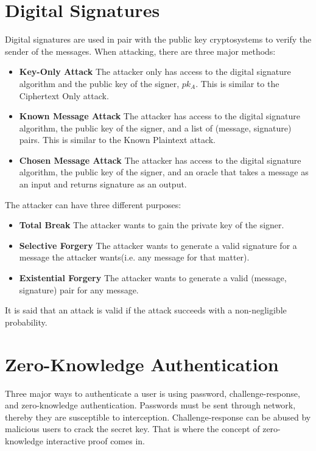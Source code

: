 \documentclass{report}
\begin{document}
	\section{Digital Signatures}
		Digital signatures are used in pair with the public key cryptosystems to verify the sender of the messages. When attacking, there are three major methods:
		\begin{itemize}
			\item \textbf{Key-Only Attack}
			\subitem The attacker only has access to the digital signature algorithm and the public key of the signer, $pk_A$. This is similar to the Ciphertext Only attack.
			\item \textbf{Known Message Attack}
			\subitem The attacker has access to the digital signature algorithm, the public key of the signer, and a list of (message, signature) pairs. This is similar to the Known Plaintext attack.
			\item \textbf{Chosen Message Attack}
			\subitem The attacker has access to the digital signature algorithm, the public key of the signer, and an oracle that takes a message as an input and returns signature as an output.
		\end{itemize}
		The attacker can have three different purposes:
		\begin{itemize}
			\item \textbf{Total Break}
			\subitem The attacker wants to gain the private key of the signer.
			\item \textbf{Selective Forgery}
			\subitem The attacker wants to generate a valid signature for a message the attacker wants(i.e. any message for that matter).
			\item \textbf{Existential Forgery}
			\subitem The attacker wants to generate a valid (message, signature) pair for any message.
		\end{itemize}
		It is said that an attack is valid if the attack succeeds with a non-negligible probability.
		
	\section{Zero-Knowledge Authentication}
		Three major ways to authenticate a user is using password, challenge-response, and zero-knowledge authentication. Passwords must be sent through network, thereby they are susceptible to interception. Challenge-response can be abused by malicious users to crack the secret key. That is where the concept of zero-knowledge interactive proof comes in.
		
\end{document}
